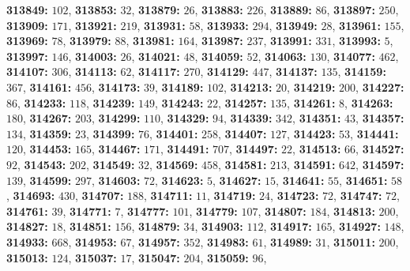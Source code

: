 \textsf{\bfseries 313849:} $102$, \textsf{\bfseries 313853:} $32$, \textsf{\bfseries 313879:} $26$, \textsf{\bfseries 313883:} $226$, \textsf{\bfseries 313889:} $86$, \textsf{\bfseries 313897:} $250$, \textsf{\bfseries 313909:} $171$, \textsf{\bfseries 313921:} $219$, \textsf{\bfseries 313931:} $58$, \textsf{\bfseries 313933:} $294$, \textsf{\bfseries 313949:} $28$, \textsf{\bfseries 313961:} $155$, \textsf{\bfseries 313969:} $78$, \textsf{\bfseries 313979:} $88$, \textsf{\bfseries 313981:} $164$, \textsf{\bfseries 313987:} $237$, \textsf{\bfseries 313991:} $331$, \textsf{\bfseries 313993:} $5$, \textsf{\bfseries 313997:} $146$, \textsf{\bfseries 314003:} $26$, \textsf{\bfseries 314021:} $48$, \textsf{\bfseries 314059:} $52$, \textsf{\bfseries 314063:} $130$, \textsf{\bfseries 314077:} $462$, \textsf{\bfseries 314107:} $306$, \textsf{\bfseries 314113:} $62$, \textsf{\bfseries 314117:} $270$, \textsf{\bfseries 314129:} $447$, \textsf{\bfseries 314137:} $135$, \textsf{\bfseries 314159:} $367$, \textsf{\bfseries 314161:} $456$, \textsf{\bfseries 314173:} $39$, \textsf{\bfseries 314189:} $102$, \textsf{\bfseries 314213:} $20$, \textsf{\bfseries 314219:} $200$, \textsf{\bfseries 314227:} $86$, \textsf{\bfseries 314233:} $118$, \textsf{\bfseries 314239:} $149$, \textsf{\bfseries 314243:} $22$, \textsf{\bfseries 314257:} $135$, \textsf{\bfseries 314261:} $8$, \textsf{\bfseries 314263:} $180$, \textsf{\bfseries 314267:} $203$, \textsf{\bfseries 314299:} $110$, \textsf{\bfseries 314329:} $94$, \textsf{\bfseries 314339:} $342$, \textsf{\bfseries 314351:} $43$, \textsf{\bfseries 314357:} $134$, \textsf{\bfseries 314359:} $23$, \textsf{\bfseries 314399:} $76$, \textsf{\bfseries 314401:} $258$, \textsf{\bfseries 314407:} $127$, \textsf{\bfseries 314423:} $53$, \textsf{\bfseries 314441:} $120$, \textsf{\bfseries 314453:} $165$, \textsf{\bfseries 314467:} $171$, \textsf{\bfseries 314491:} $707$, \textsf{\bfseries 314497:} $22$, \textsf{\bfseries 314513:} $66$, \textsf{\bfseries 314527:} $92$, \textsf{\bfseries 314543:} $202$, \textsf{\bfseries 314549:} $32$, \textsf{\bfseries 314569:} $458$, \textsf{\bfseries 314581:} $213$, \textsf{\bfseries 314591:} $642$, \textsf{\bfseries 314597:} $139$, \textsf{\bfseries 314599:} $297$, \textsf{\bfseries 314603:} $72$, \textsf{\bfseries 314623:} $5$, \textsf{\bfseries 314627:} $15$, \textsf{\bfseries 314641:} $55$, \textsf{\bfseries 314651:} $58$, \textsf{\bfseries 314693:} $430$, \textsf{\bfseries 314707:} $188$, \textsf{\bfseries 314711:} $11$, \textsf{\bfseries 314719:} $24$, \textsf{\bfseries 314723:} $72$, \textsf{\bfseries 314747:} $72$, \textsf{\bfseries 314761:} $39$, \textsf{\bfseries 314771:} $7$, \textsf{\bfseries 314777:} $101$, \textsf{\bfseries 314779:} $107$, \textsf{\bfseries 314807:} $184$, \textsf{\bfseries 314813:} $200$, \textsf{\bfseries 314827:} $18$, \textsf{\bfseries 314851:} $156$, \textsf{\bfseries 314879:} $34$, \textsf{\bfseries 314903:} $112$, \textsf{\bfseries 314917:} $165$, \textsf{\bfseries 314927:} $148$, \textsf{\bfseries 314933:} $668$, \textsf{\bfseries 314953:} $67$, \textsf{\bfseries 314957:} $352$, \textsf{\bfseries 314983:} $61$, \textsf{\bfseries 314989:} $31$, \textsf{\bfseries 315011:} $200$, \textsf{\bfseries 315013:} $124$, \textsf{\bfseries 315037:} $17$, \textsf{\bfseries 315047:} $204$, \textsf{\bfseries 315059:} $96$, 
